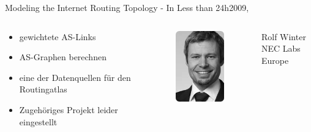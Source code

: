 \documentclass[ngerman,compress,hyperref={bookmarks}]{beamer}
\begin{document}
\begin{frame}{Modeling the Internet Routing Topology - In Less than 24h}{2009, \cite{Winter:2009:MIR:1577959.1577976}}
  \begin{columns}[c]
    \begin{column}{0.5\textwidth}
      \begin{itemize}
        \item gewichtete AS-Links
        \item AS-Graphen berechnen
        \item eine der Datenquellen für den Routingatlas
        \item Zugehöriges Projekt leider eingestellt
      \end{itemize}
    \end{column}
    \begin{column}{0.09\textwidth}
      \begin{figure}
        \label{winter}
        \includegraphics[width=1\textwidth]{images/winter_r}
      \end{figure}
    \end{column}
    \begin{column}{0.3\textwidth}
      {\scriptsize Rolf Winter\\
      \vspace{0.1cm}
      NEC Labs Europe\\ }
    \end{column}
  \end{columns}
\end{frame}
\end{document}
